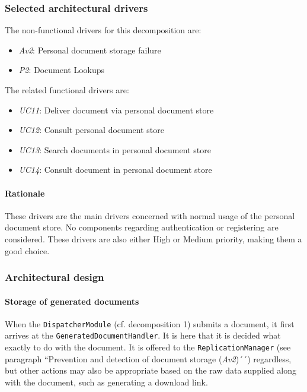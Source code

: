 \documentclass[a4paper,10pt]{article}
\begin{document}
\subsubsection{Selected architectural drivers}
The non-functional drivers for this decomposition are:

\begin{itemize}
    \item \emph{Av2}: Personal document storage failure
    \item \emph{P2}: Document Lookups
\end{itemize}

The related functional drivers are:

\begin{itemize}
    \item \emph{UC11}: Deliver document via personal document store
    \item \emph{UC12}: Consult personal document store
    \item \emph{UC13}: Search documents in personal document store
    \item \emph{UC14}: Consult document in personal document store
\end{itemize}

\paragraph{Rationale}
These drivers are the main drivers concerned with normal usage of the personal document store. No components regarding authentication or registering are considered. These drivers are also either High or Medium priority, making them a good choice.

\subsubsection{Architectural design}

\paragraph{Storage of generated documents}
When the \texttt{DispatcherModule} (cf. decomposition 1) submits a document, it first arrives at the \texttt{GeneratedDocumentHandler}. It is here that it is decided what exactly to do with the document. It is offered to the \texttt{ReplicationManager} (see paragraph ``Prevention and detection of document storage (\emph{Av2})´´) regardless, but other actions may also be appropriate based on the raw data supplied along with the document, such as generating a download link.
\end{document}
